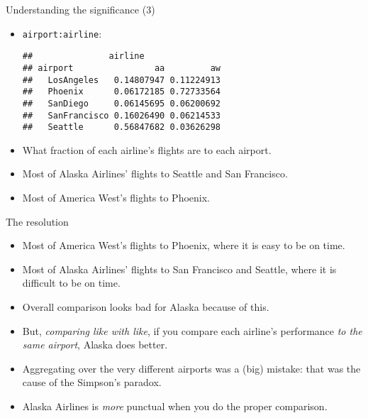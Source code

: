 \begin{frame}[fragile]{Understanding the significance (3)}
  
  \begin{itemize}
  \item \texttt{airport:airline}:
    
\begin{knitrout}
\color{fgcolor}\begin{kframe}
\begin{alltt}
\hlkwb{=}\hlopt{~}\hlopt{+}
\hlstd{=}\hlstd{)}
\end{alltt}
\begin{verbatim}
##               airline
## airport                aa         aw
##   LosAngeles   0.14807947 0.11224913
##   Phoenix      0.06172185 0.72733564
##   SanDiego     0.06145695 0.06200692
##   SanFrancisco 0.16026490 0.06214533
##   Seattle      0.56847682 0.03626298
\end{verbatim}
\end{kframe}
\end{knitrout}
\item What fraction of each airline's flights are to each airport.
\item Most of Alaska Airlines' flights to Seattle and San Francisco.
\item Most of America West's flights to Phoenix.
  \end{itemize}
  
\end{frame}

\begin{frame}[fragile]{The resolution}
  
  \begin{itemize}
  \item Most of America West's flights to Phoenix, where it is easy to
    be on time.
  \item Most of Alaska Airlines' flights to San Francisco and Seattle,
    where it is difficult to be on time.
  \item Overall comparison looks bad for Alaska because of this.
  \item But, \emph{comparing like with like}, if you compare each
    airline's performance \emph{to the same airport}, Alaska does better.
  \item Aggregating over the very different airports was a (big)
    mistake: that was the cause of the Simpson's paradox.
  \item Alaska Airlines is \emph{more} punctual when you do the proper comparison.
  \end{itemize}
  
\end{frame}




















